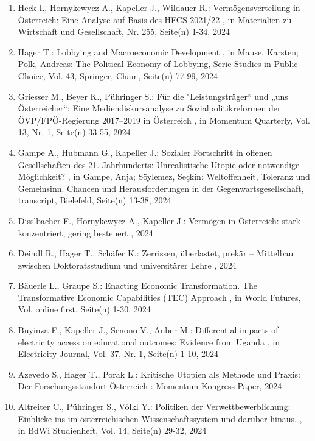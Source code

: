 \begin{enumerate}[leftmargin=*, labelsep=0.5cm]
	 \item Heck I., Hornykewycz A., Kapeller J., Wildauer R.:  Vermögensverteilung  in Österreich: Eine Analyse auf Basis des HFCS 2021/22  , in Materialien zu Wirtschaft und Gesellschaft, Nr. 255, Seite(n) 1-34, 2024
	 \item Hager T.:  Lobbying and Macroeconomic Development  , in Mause, Karsten; Polk, Andreas: The Political Economy of Lobbying, Serie Studies in Public Choice, Vol. 43, Springer, Cham, Seite(n) 77-99, 2024
	 \item Griesser M., Beyer K., Pühringer S.:  Für die "Leistungsträger“ und „uns Österreicher“: Eine Mediendiskursanalyse zu Sozialpolitikreformen der ÖVP/FPÖ-Regierung 2017–2019 in Österreich  , in Momentum Quarterly, Vol. 13, Nr. 1, Seite(n) 33-55, 2024
	 \item Gampe A., Hubmann G., Kapeller J.:  Sozialer Fortschritt in offenen Gesellschaften des 21. Jahrhunderts: Unrealistische Utopie oder notwendige Möglichkeit?  , in Gampe, Anja; Söylemez, Seçkin: Weltoffenheit, Toleranz und Gemeinsinn. Chancen und Herausforderungen in der Gegenwartsgesellschaft, transcript, Bielefeld, Seite(n) 13-38, 2024
	 \item Disslbacher F., Hornykewycz A., Kapeller J.:  Vermögen in Österreich: stark konzen­triert, gering be­steuert  , 2024
	 \item Deindl R., Hager T., Schäfer K.:  Zerrissen, überlastet, prekär – Mittelbau zwischen Doktoratsstudium und universitärer Lehre  , 2024
	 \item Bäuerle L., Graupe S.:  Enacting Economic Transformation. The Transformative Economic Capabilities (TEC) Approach  , in World Futures, Vol. online first, Seite(n) 1-30, 2024
	 \item Buyinza F., Kapeller J., Senono V., Anber M.:  Differential impacts of electricity access on educational outcomes: Evidence from Uganda  , in Electricity Journal, Vol. 37, Nr. 1, Seite(n) 1-10, 2024
	 \item Azevedo S., Hager T., Porak L.:  Kritische Utopien als Methode und Praxis: Der Forschungsstandort Österreich  : Momentum Kongress Paper, 2024
	 \item Altreiter C., Pühringer S., Völkl Y.:  Politiken der Verwettbewerblichung: Einblicke ins im österreichischen Wissenschaftssystem und darüber hinaus.  , in BdWi Studienheft, Vol. 14, Seite(n) 29-32, 2024
\end{enumerate} 
